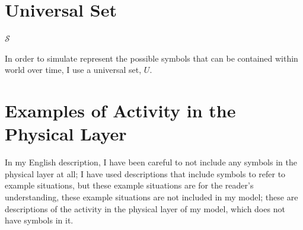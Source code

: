 \section{Universal Set}

$\mathcal{S}$

In order to simulate represent the possible symbols that can be
contained within world over time, I use a universal set, $U$.


\section{Examples of Activity in the Physical Layer}

In my English description, I have been careful to not include any
symbols in the physical layer at all; I have used descriptions that
include symbols to refer to example situations, but these example
situations are for the reader's understanding, these example
situations are not included in my model; these are descriptions of the
activity in the physical layer of my model, which does not have
symbols in it.

